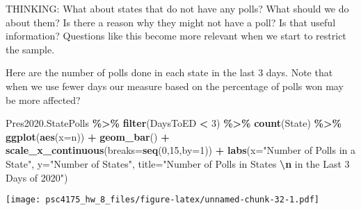 \documentclass[
]{article}
\newenvironment{Shaded}{\begin{snugshade}}{\end{snugshade}}
\newcommand{\AttributeTok}[1]{\textcolor[rgb]{0.13,0.29,0.53}{#1}}
\newcommand{\DecValTok}[1]{\textcolor[rgb]{0.00,0.00,0.81}{#1}}
\newcommand{\FunctionTok}[1]{\textcolor[rgb]{0.13,0.29,0.53}{\textbf{#1}}}
\newcommand{\NormalTok}[1]{#1}
\newcommand{\SpecialCharTok}[1]{\textcolor[rgb]{0.81,0.36,0.00}{\textbf{#1}}}
\newcommand{\StringTok}[1]{\textcolor[rgb]{0.31,0.60,0.02}{#1}}
\begin{document}
THINKING: What about states that do not have any polls? What should we
do about them? Is there a reason why they might not have a poll? Is that
useful information? Questions like this become more relevant when we
start to restrict the sample.

Here are the number of polls done in each state in the last 3 days. Note
that when we use fewer days our measure based on the percentage of polls
won may be more affected?

\begin{Shaded}
\begin{Highlighting}[]
\NormalTok{Pres2020.StatePolls }\SpecialCharTok{\%\textgreater{}\%}
  \FunctionTok{filter}\NormalTok{(DaysToED }\SpecialCharTok{\textless{}} \DecValTok{3}\NormalTok{) }\SpecialCharTok{\%\textgreater{}\%}
  \FunctionTok{count}\NormalTok{(State) }\SpecialCharTok{\%\textgreater{}\%}
  \FunctionTok{ggplot}\NormalTok{(}\FunctionTok{aes}\NormalTok{(}\AttributeTok{x=}\NormalTok{n)) }\SpecialCharTok{+}
  \FunctionTok{geom\_bar}\NormalTok{() }\SpecialCharTok{+} 
  \FunctionTok{scale\_x\_continuous}\NormalTok{(}\AttributeTok{breaks=}\FunctionTok{seq}\NormalTok{(}\DecValTok{0}\NormalTok{,}\DecValTok{15}\NormalTok{,}\AttributeTok{by=}\DecValTok{1}\NormalTok{)) }\SpecialCharTok{+}
  \FunctionTok{labs}\NormalTok{(}\AttributeTok{x=}\StringTok{"Number of Polls in a State"}\NormalTok{,}
       \AttributeTok{y=}\StringTok{"Number of States"}\NormalTok{,}
       \AttributeTok{title=}\StringTok{"Number of Polls in States }\SpecialCharTok{\textbackslash{}n}\StringTok{ in the Last 3 Days of 2020"}\NormalTok{)}
\end{Highlighting}
\end{Shaded}

\texttt{[image: psc4175\_hw\_8\_files/figure-latex/unnamed-chunk-32-1.pdf]}
\end{document}
